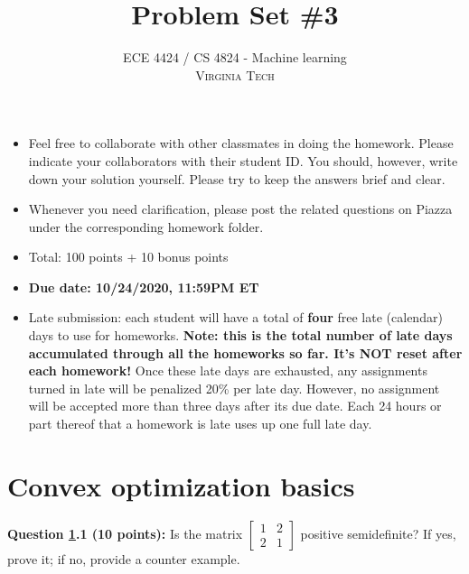 \documentclass[12pt]{article}
\title{Problem Set \#3} %
\author{ECE 4424 / CS 4824 - Machine learning\\ %
\textsc{Virginia Tech}
}
\newcommand{\prsol}[1]{\ifthenelse{\boolean{sol}}{{\color{blue}\textbf{Solution:} #1}}{} }
\begin{document}


\setlength{\droptitle}{-5em}    
\maketitle


\begin{itemize}
    \item Feel free to collaborate with other classmates in doing the homework. Please indicate your collaborators with their student ID. You should, however, write down your solution yourself. Please try to keep the answers brief and clear.
    \item Whenever you need clarification, please post the related questions on Piazza under the corresponding homework folder.
    \item Total: 100 points + 10 bonus points
    \item \textbf{Due date: 10/24/2020, 11:59PM ET}
    \item Late submission: each student will have a total of \textbf{four} free late (calendar) days to use for homeworks. \textbf{Note: this is the total number of late days accumulated through all the homeworks so far. It's NOT reset after each homework!} Once these late days are exhausted, any assignments turned in late will be penalized 20\% per late day. However, no assignment will be accepted more than three days after its due date. Each 24 hours or part thereof that a homework is late uses up one full late day. 
\end{itemize}



\section{Convex optimization basics}
\label{sec:convex}

\textbf{Question \ref{sec:convex}.1 (10 points):}  Is the matrix $\begin{bmatrix}1&2\\2&1\end{bmatrix}$ positive semidefinite? If yes, prove it; if no, provide a counter example.

\prsol{

}
\end{document}
